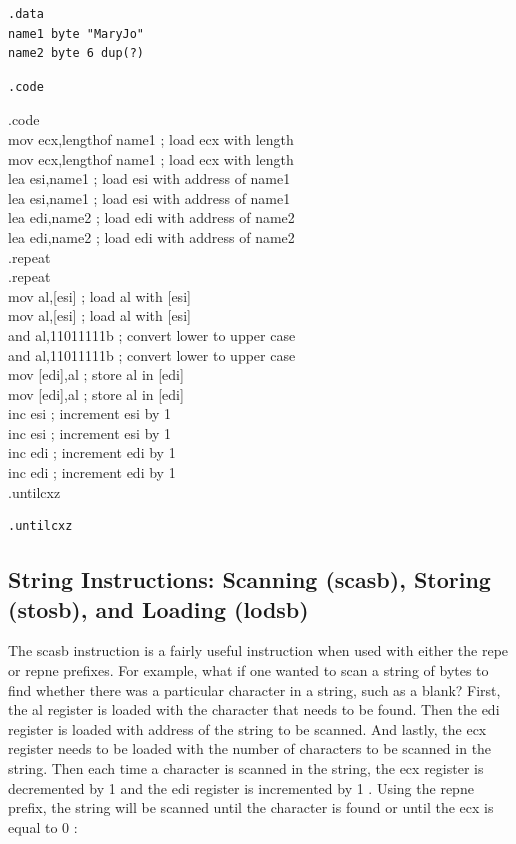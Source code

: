 \documentclass[10pt]{book}
\begin{document}
\begin{verbatim}
.data
name1 byte "MaryJo"
name2 byte 6 dup(?)
\end{verbatim}

\begin{verbatim}
.code
\end{verbatim}

.code\\
mov ecx,lengthof name1 ; load ecx with length\\

mov ecx,lengthof name1 ; load ecx with length\\
lea esi,name1 ; load esi with address of name1\\
lea esi,name1 ; load esi with address of name1\\
lea edi,name2 ; load edi with address of name2\\
lea edi,name2 ; load edi with address of name2\\
.repeat\\
.repeat\\[0pt]
mov al,[esi] ; load al with [esi]\\[0pt]
mov al,[esi] ; load al with [esi]\\
and al,11011111b ; convert lower to upper case\\
and al,11011111b ; convert lower to upper case\\[0pt]
mov [edi],al ; store al in [edi]\\[0pt]
mov [edi],al ; store al in [edi]\\
inc esi ; increment esi by 1\\
inc esi ; increment esi by 1\\
inc edi ; increment edi by 1\\
inc edi ; increment edi by 1\\
.untilcxz

\begin{verbatim}
.untilcxz
\end{verbatim}

\subsection{String Instructions: Scanning (scasb), Storing (stosb), and Loading (lodsb)}
The scasb instruction is a fairly useful instruction when used with either the repe or repne prefixes. For example, what if one wanted to scan a string of bytes to find whether there was a particular character in a string, such as a blank? First, the al register is loaded with the character that needs to be found. Then the edi register is loaded with address of the string to be scanned. And lastly, the ecx register needs to be loaded with the number of characters to be scanned in the string. Then each time a character is scanned in the string, the ecx register is decremented by 1 and the edi register is incremented by 1 . Using the repne prefix, the string will be scanned until the character is found or until the ecx is equal to 0 :
\end{document}
